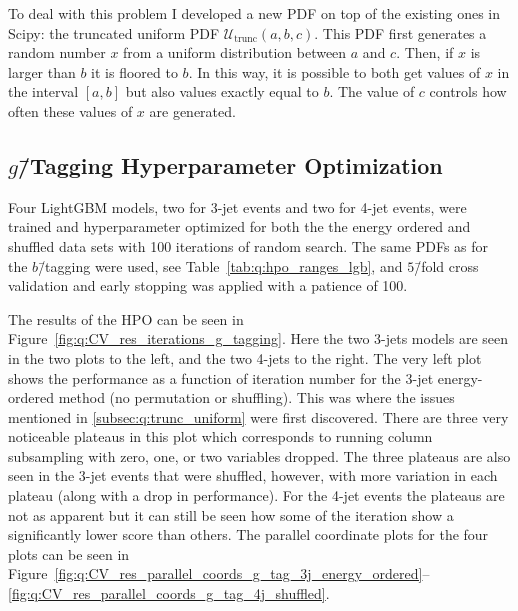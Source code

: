 To deal with this problem I developed a new PDF on top of the existing ones in Scipy: the truncated uniform PDF $\mathcal{U}_\mathrm{trunc}(a, b, c)$. This PDF first generates a random number $x$ from a uniform distribution between $a$ and $c$. Then, if $x$ is larger than $b$ it is floored to $b$. In this way, it is possible to both get values of $x$ in the interval $[a, b]$ but also values exactly equal to $b$. The value of $c$ controls how often these  values of $x$ are generated.

\subsection{$g$\=/Tagging Hyperparameter Optimization}

Four LightGBM models, two for 3-jet events and two for 4-jet events, were trained and hyperparameter optimized for both the the energy ordered and shuffled data sets with \num{100} iterations of random search. The same PDFs as for the $b$\=/tagging were used, see Table~\ref{tab:q:hpo_ranges_lgb}, and $5$\=/fold cross validation and early stopping was applied with a patience of \num{100}. 

The results of the HPO can be seen in Figure~\ref{fig:q:CV_res_iterations_g_tagging}. Here the two 3-jets models are seen in the two plots to the left, and the two 4-jets to the right. The very left plot shows the performance as a function of iteration number for the 3-jet energy-ordered method (no permutation or shuffling). This was where the issues mentioned in \autoref{subsec:q:trunc_uniform} were first discovered. There are three very noticeable plateaus in this plot which corresponds to running column subsampling with zero, one, or two variables dropped. The three plateaus are also seen in the 3-jet events that were shuffled, however, with more variation in each plateau (along with a drop in performance). For the 4-jet events the plateaus are not as apparent but it can still be seen how some of the iteration show a significantly lower score than others. The parallel coordinate plots for the four plots can be seen in Figure~\ref{fig:q:CV_res_parallel_coords_g_tag_3j_energy_ordered}--\ref{fig:q:CV_res_parallel_coords_g_tag_4j_shuffled}.

